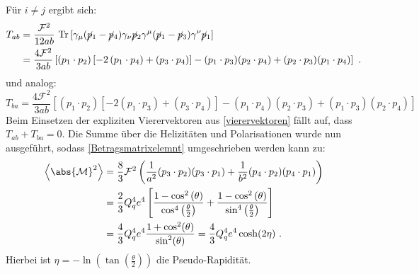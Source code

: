 Für $i \neq j$ ergibt sich:
\begin{equation}
\begin{aligned}
T_{ab} &= \frac{\mathcal{F}^2}{12ab}~\text{Tr}\left[\gamma_\mu(\cancel{p}_1- \cancel{p}_4)  \gamma_\nu \cancel{p}_2 \gamma^\mu (\cancel{p}_1- \cancel{p}_3)  \gamma^\nu \cancel{p}_1 \right] \\
&=  \frac{4\mathcal{F}^2}{3ab} \left[\left( p_1\cdot p_2\right) \left[ -2 \left( p_1 \cdot p_4 \right) + \left(p_3 \cdot p_4\right)\right] - (p_1\cdot p_3)(p_2\cdot p_4) + (p_2\cdot p_3)(p_1\cdot p_4)\right]~.
\end{aligned}
\end{equation}
und analog:
\begin{equation}
T_{ba} = \frac{4\mathcal{F}^2}{3ab} \left[\left( p_1\cdot p_2\right) \left[ -2 \left( p_1 \cdot p_3 \right) + \left(p_3 \cdot p_4\right)\right] - (p_1\cdot p_4)(p_2\cdot p_3) + (p_1\cdot p_3)(p_2\cdot p_4)\right]
\end{equation}
Beim Einsetzen der expliziten Vierervektoren aus \textsf{\autoref{vierervektoren}} fällt auf, dass $T_{ab} + T_{ba} = 0$. Die Summe über die Helizitäten und Polarisationen wurde nun ausgeführt, sodass \textsf{\autoref{Betragsmatrixelemnt}} umgeschrieben werden kann zu:
\begin{equation}
\begin{aligned}
\left\langle  \abs{\mathcal{M}}^2\right\rangle &= \frac{8}{3}\mathcal{F}^2 \left(\frac{1}{a^2}(p_3\cdot p_2)(p_3\cdot p_1) + \frac{1}{b^2} (p_4\cdot p_2)(p_4\cdot p_1) \right) \\
&= \frac{2}{3}Q_q^4e^4\left[\frac{1-\cos^2\left(\theta\right)}{\cos^4\left(\frac{\theta}{2}\right)} + \frac{1-\cos^2\left(\theta\right)}{\sin^4\left(\frac{\theta}{2}\right)}\right] \\
&=\frac{4}{3} Q_q^4e^4\frac{1+\cos^2(\theta)}{\sin^2(\theta)} = \frac{4}{3} Q_q^4e^4\cosh(2\eta)~.
\end{aligned}
\end{equation}
Hierbei ist  $\eta = -\ln\left(\tan\left(\frac{\theta}{2}\right)\right)$ die Pseudo-Rapidität.
